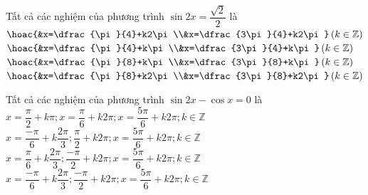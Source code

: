 \begin{ex}%
	Tất cả các nghiệm của phương trình $\sin 2x=\dfrac{\sqrt{2}}{2}$ là
	\choice
	{$\hoac{&x=\dfrac{\pi}{4}+k2\pi\\&x=\dfrac{3\pi}{4}+k2\pi} \left(k\in \mathbb{Z}\right)$}
	{$\hoac{&x=\dfrac{\pi}{4}+k\pi\\&x=\dfrac{3\pi}{4}+k\pi} \left(k\in \mathbb{Z}\right)$}
	{\True $\hoac{&x=\dfrac{\pi}{8}+k\pi\\&x=\dfrac{3\pi}{8}+k\pi} \left(k\in \mathbb{Z}\right)$}
	{$\hoac{&x=\dfrac{\pi}{8}+k2\pi\\&x=\dfrac{3\pi}{8}+k2\pi} \left(k\in \mathbb{Z}\right)$}
\end{ex}
\begin{ex}%
	Tất cả các nghiệm của phương trình $\sin 2x-\cos x=0$ là
	\choice
	{\True $x=\dfrac{\pi}{2}+k\pi;x=\dfrac{\pi}{6}+k2\pi;x=\dfrac{5\pi}{6}+k2\pi;k\in \mathbb{Z}$}
	{$x=\dfrac{-\pi}{6}+k\dfrac{2\pi}{3};\dfrac{\pi}{2}+k2\pi;x=\dfrac{5\pi}{6}+k2\pi;k\in \mathbb{Z}$}
	{$x=\dfrac{\pi}{6}+k\dfrac{2\pi}{3};\dfrac{-\pi}{2}+k2\pi;x=\dfrac{5\pi}{6}+k2\pi;k\in \mathbb{Z}$}
	{$x=\dfrac{-\pi}{6}+k\dfrac{2\pi}{3};\dfrac{-\pi}{2}+k2\pi;x=\dfrac{5\pi}{6}+k2\pi;k\in \mathbb{Z}$}
\end{ex}
